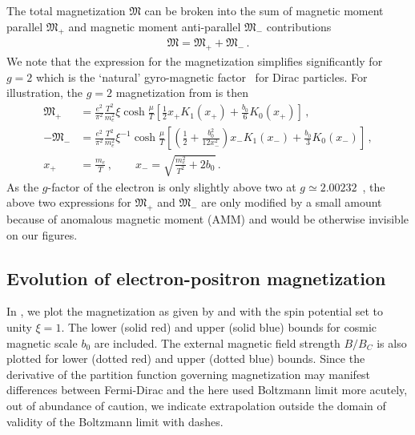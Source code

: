 The total magnetization ${\mathfrak M}$ can be broken into the sum of magnetic moment parallel ${\mathfrak M}_{+}$ and magnetic moment anti-parallel ${\mathfrak M}_{-}$ contributions
\begin{align}
\label{g2mag}
{\mathfrak M}={\mathfrak M}_{+}+{\mathfrak M}_{-}\,.
\end{align}
We note that the expression for the magnetization simplifies significantly for $g\!=\!2$ which is the `natural' gyro-magnetic factor~\cite{Evans:2022fsu,Rafelski:2022bsv} for Dirac particles. For illustration, the $g\!=\!2$ magnetization from  is then
\begin{align}
 \label{g2magplus}
 {\mathfrak M}_{+}&=\frac{e^{2}}{\pi^{2}}\frac{T^{2}}{m_{e}^{2}}\xi\cosh{\frac{\mu}{T}}\left[\frac{1}{2}x_{+}K_{1}(x_{+})+\frac{b_{0}}{6}K_{0}(x_{+})\right]\,,\\
 \label{g2magminus}
 -{\mathfrak M}_{-}&=\frac{e^{2}}{\pi^{2}}\frac{T^{2}}{m_{e}^{2}}\xi^{-1}\cosh{\frac{\mu}{T}}
 \left[\left(\frac{1}{2}+\frac{b_{0}^{2}}{12x_{-}^{2}}\right)x_{-}K_{1}(x_{-})+\frac{b_{0}}{3}K_{0}(x_{-})\right]\,,\\
 x_{+}&=\frac{m_{e}}{T}\,,\qquad
 x_{-}=\sqrt{\frac{m_{e}^{2}}{T^{2}}+2b_{0}}\,.
\end{align}
As the $g$-factor of the electron is only slightly above two at $g\simeq2.00232$~\cite{Tiesinga:2021myr}, the above two expressions for ${\mathfrak M}_{+}$ and ${\mathfrak M}_{-}$ are only modified by a small amount because of anomalous magnetic moment (AMM) and would be otherwise invisible on our figures.

\subsection{Evolution of electron-positron magnetization}
\label{sec:paramagnetism}
\noindent In , we plot the magnetization as given by  and  with the spin potential set to unity $\xi=1$. The lower (solid red) and upper (solid blue) bounds for cosmic magnetic scale $b_{0}$ are included. The external magnetic field strength ${B}/{B}_{C}$ is also plotted for lower (dotted red) and upper (dotted blue) bounds. Since the derivative of the partition function governing magnetization may manifest differences between Fermi-Dirac and the here used Boltzmann limit more acutely, out of abundance of caution, we indicate extrapolation outside the domain of validity of the Boltzmann limit with dashes.

